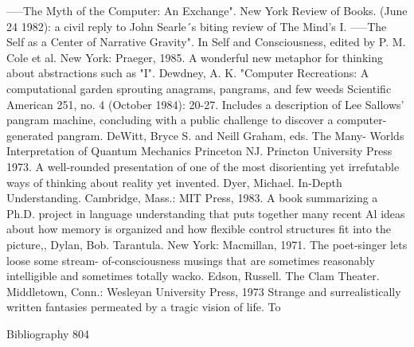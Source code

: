 -----The Myth of the Computer: An Exchange". New York Review of Books. (June 24 1982):
  a civil reply to John Searle´s biting review of The Mind's I.
-----The Self as a Center of Narrative Gravity". In Self and Consciousness, edited by P. M.
  Cole et al. New York: Praeger, 1985. A wonderful new metaphor for thinking about
  abstractions such as "I".
Dewdney, A. K. "Computer Recreations: A computational garden sprouting anagrams,
  pangrams, and few weeds Scientific American 251, no. 4 (October 1984): 20-27. Includes a
  description of Lee Sallows' pangram machine, concluding with a public challenge to
  discover a computer-generated pangram.
DeWitt, Bryce S. and Neill Graham, eds. The Many- Worlds Interpretation of Quantum
  Mechanics Princeton NJ. Princton University Press 1973. A well-rounded presentation of
  one of the most disorienting yet irrefutable ways of thinking about reality yet invented.
Dyer, Michael. In-Depth Understanding. Cambridge, Mass.: MIT Press, 1983. A book
  summarizing a Ph.D. project in language understanding that puts together many recent Al
  ideas about how memory is organized and how flexible control structures fit into the
  picture,,
Dylan, Bob. Tarantula. New York: Macmillan, 1971. The poet-singer lets loose some stream-
  of-consciousness musings that are sometimes reasonably intelligible and sometimes totally
  wacko.
Edson, Russell. The Clam Theater. Middletown, Conn.: Wesleyan University Press, 1973
  Strange and surrealistically written fantasies permeated by a tragic vision of life. To


Bibliography                                                                             804

